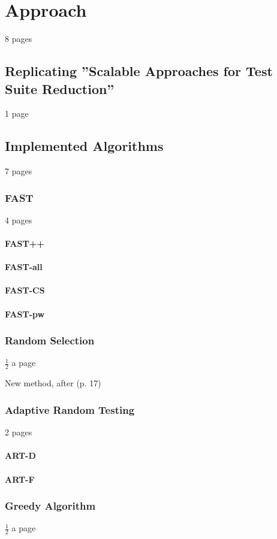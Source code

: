 
\chapter{Approach}\label{chapter:approach}

8 pages

\section{Replicating ''Scalable Approaches for Test Suite Reduction''}

1 page

\section{Implemented Algorithms}

7 pages

\subsection{FAST}

4 pages

\subsubsection{FAST++}

\subsubsection{FAST-all}

\subsubsection{FAST-CS}

\subsubsection{FAST-pw}

\subsection{Random Selection}

$\frac{1}{2}$ a page

New method, after \cite{khan2018systematic} (p. 17)

\subsection{Adaptive Random Testing}

2 pages

\subsubsection{ART-D}

\subsubsection{ART-F}

\subsection{Greedy Algorithm}

$\frac{1}{2}$ a page
